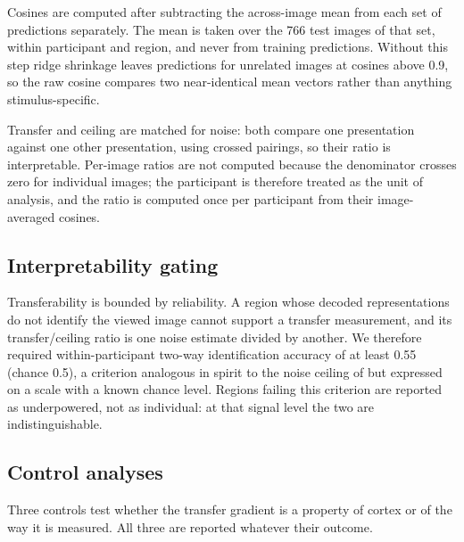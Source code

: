 \documentclass[11pt,a4paper]{article}
\begin{document}
Cosines are computed after subtracting the across-image mean from each set of
predictions separately. The mean is taken over the 766 test images of that set,
within participant and region, and never from training predictions. Without this
step ridge shrinkage leaves predictions for unrelated images at cosines above
\num{0.9}, so the raw cosine compares two near-identical mean vectors rather than
anything stimulus-specific.

Transfer and ceiling are matched for noise: both compare one presentation against
one other presentation, using crossed pairings, so their ratio is interpretable.
Per-image ratios are not computed because the denominator crosses zero for individual
images; the participant is therefore treated as the unit of analysis, and the ratio is
computed once per participant from their image-averaged cosines.

\subsection{Interpretability gating}

Transferability is bounded by reliability. A region whose decoded representations
do not identify the viewed image cannot support a transfer measurement, and its
transfer/ceiling ratio is one noise estimate divided by another. We therefore
required within-participant two-way identification accuracy of at least 0.55
(chance 0.5), a criterion analogous in spirit to the noise ceiling of
\citet{nili2014} but expressed on a scale with a known chance level. Regions
failing this criterion are reported as underpowered, not as individual: at that
signal level the two are indistinguishable.

\subsection{Control analyses}

Three controls test whether the transfer gradient is a property of cortex or of
the way it is measured. All three are reported whatever their outcome.
\end{document}
